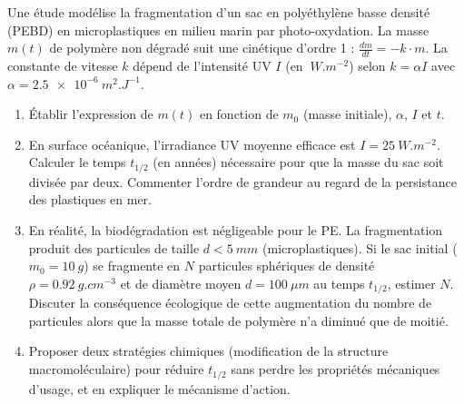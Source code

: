\documentclass[11pt]{article}
\begin{document}
\begin{exercice}
Une étude modélise la fragmentation d'un sac en polyéthylène basse densité (PEBD) en microplastiques en milieu marin par photo-oxydation. La masse $m(t)$ de polymère non dégradé suit une cinétique d'ordre 1 : $\frac{dm}{dt} = -k \cdot m$. La constante de vitesse $k$ dépend de l'intensité UV $I$ (en $\SI{}{W.m^{-2}}$) selon $k = \alpha I$ avec $\alpha = \SI{2,5e-6}{m^2.J^{-1}}$.
\begin{enumerate}
    \item Établir l'expression de $m(t)$ en fonction de $m_0$ (masse initiale), $\alpha$, $I$ et $t$.
    \item En surface océanique, l'irradiance UV moyenne efficace est $I = \SI{25}{W.m^{-2}}$. Calculer le temps $t_{1/2}$ (en années) nécessaire pour que la masse du sac soit divisée par deux. Commenter l'ordre de grandeur au regard de la persistance des plastiques en mer.
    \item En réalité, la biodégradation est négligeable pour le PE. La fragmentation produit des particules de taille $d < \SI{5}{mm}$ (microplastiques). Si le sac initial ($m_0 = \SI{10}{g}$) se fragmente en $N$ particules sphériques de densité $\rho = \SI{0,92}{g.cm^{-3}}$ et de diamètre moyen $d = \SI{100}{\mu m}$ au temps $t_{1/2}$, estimer $N$. Discuter la conséquence écologique de cette augmentation du nombre de particules alors que la masse totale de polymère n'a diminué que de moitié.
    \item Proposer deux stratégies chimiques (modification de la structure macromoléculaire) pour réduire $t_{1/2}$ sans perdre les propriétés mécaniques d'usage, et en expliquer le mécanisme d'action.
\end{enumerate}
\end{exercice}
\end{document}
